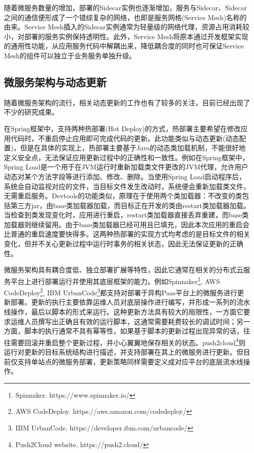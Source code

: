 \documentclass[macfonts,master]{njuthesis}
\begin{document}
随着微服务数量的增加，部署的Sidecar实例也逐渐增加，服务与Sidecar、Sidecar之间的通信便形成了一个错综复杂的网络，也即是服务网格(Service Mesh)名称的由来。Service Mesh插入的Sidecar实例通常为轻量级的网络代理，资源占用消耗较小，对部署的服务实例保持透明性。此外，Service Mesh将原本通过开发框架实现的通用性功能，从应用服务代码中解耦出来，降低耦合度的同时也可保证Service Mesh的组件可以独立于业务服务单独升级。

\subsection{微服务架构与动态更新}
随着微服务架构的流行，相关动态更新的工作也有了较多的关注，目前已经出现了不少的研究成果。

在Spring框架中，支持两种热部署(Hot Deploy)的方式，热部署主要希望在修改应用代码时，不重启停止应用即可完成代码的更新。此功能类似与动态更新(动态配置)，但是在具体的实现上，热部署主要基于Java的动态类加载机制，不能很好地定义安全点，无法保证应用更新过程中的正确性和一致性。例如在Spring框架中，Spring Load是一个用于在JVM运行时重新加载类文件更改的JVM代理，允许用户动态对某个方法字段等进行添加、修改、删除。当使用Spring Load启动程序后，系统会自动监视对应的文件，当目标文件发生改动时，系统便会重新加载类文件，无需重启服务。Devtools的功能类似，原理在于使用两个类加载器：不改变的类包括第三方jar，由base类加载器加载，而目标正在开发的类由restart类加载器加载。当检查到类发现变化时，应用进行重启，restart类加载器直接丢弃重建，而base类加载器则继续留用。由于base类加载器已经可用且已填充，因此本次应用的重启会比普通的重启速度要快得多。这两种热部署的实现方式均考虑的是目标文件的相关变化，但并不关心更新过程中运行时事务的相关状态，因此无法保证更新的正确性。

微服务架构具有耦合度低、独立部署扩展等特性，因此它通常在相关的分布式云服务平台上进行部署运行并使用其底层框架的能力\cite{sampaio2017supporting}。例如Spinnaker\footnote{Spinnaker. https://www.spinnaker.io/}, AWS CodeDeploy\footnote{AWS CodeDeploy. https://aws.amazon.com/codedeploy/}, IBM UrbanCode\footnote{IBM UrbanCode. https://developer.ibm.com/urbancode/}都支持对部署于异构Paas平台上的微服务进行更新部署。更新的执行主要依靠运维人员对底层操作进行编写，并形成一系列的流水线操作，最后以脚本的形式来运行。这种更新方法具有较大的局限性，一方面它要求运维人员撰写出正确且有效的运行脚本，这通常需要耗费较长的调试时间；另一方面，脚本的执行通常不具有幂等性，如果基于脚本的更新过程出现异常的话，往往需要回滚并重启整个更新过程，并小心翼翼地保存相关的状态。push2cloud\footnote{Push2Cloud website. https://push2.cloud/}则运行对更新的目标系统结构进行描述，并支持部署在其上的微服务进行更新。但目前仅支持单站点的微服务部署，更新策略同样需要定义成对应平台的底层流水线操作。
\end{document}
